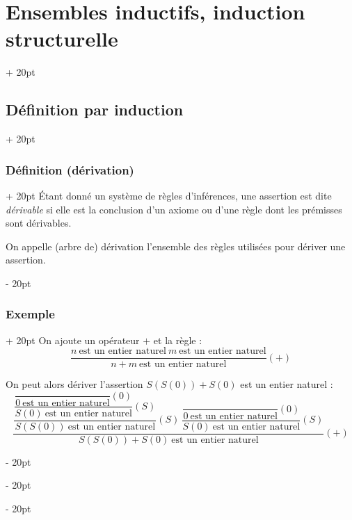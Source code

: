 \documentclass[a4paper, 12pt, twoside]{article}
\newcommand{\ind}[1][20pt]{\advance\leftskip + #1}
\newcommand{\deind}[1][20pt]{\advance\leftskip - #1}
\newenvironment{indt}[2][20pt]{#2 \par \ind[#1]}{\par \deind} %
\begin{document}
\begin{indt}{\section{Ensembles inductifs, induction structurelle}}
\begin{indt}{\subsection{Définition par induction}}
            \begin{indt}{\subsubsection{Définition (dérivation)}}
                \'Etant donné un système de règles d'inférences, une assertion est dite \textit{dérivable} si elle est la conclusion d'un axiome ou d'une règle dont les prémisses sont dérivables.
                
                On appelle (arbre de) dérivation l'ensemble des règles utilisées pour dériver une assertion.
            \end{indt}
            
            \vspace{12pt}
            
            \begin{indt}{\subsubsection{Exemple}}
                On ajoute un opérateur $+$ et la règle :
                    \[ \dfrac{n\ \text{est un entier naturel}\ m\ \text{est un entier naturel}}{n + m\ \text{est un entier naturel}} (+) \]
                
                On peut alors dériver l'assertion $S(S(0)) + S(0)$ est un entier naturel :
                    \[
                        \dfrac{
                            \dfrac{
                                \dfrac{
                                    \dfrac{}{0\ \text{est un entier naturel}} (0)
                                }
                                {
                                    S(0)\ \text{est un entier naturel}
                                } (S)
                            }
                            {
                                S(S(0))\ \text{est un entier naturel}} (S)\
                                \dfrac{
                                    \dfrac{}{0\ \text{est un entier naturel}} (0)
                                }
                                {
                                    S(0)\ \text{est un entier naturel}
                                } (S)
                        }
                        {
                            S(S(0)) + S(0)\ \text{est un entier naturel}
                        }
                            (+)
                    \]
                
            \end{indt}
            

\end{indt}
\end{indt}
\end{document}
